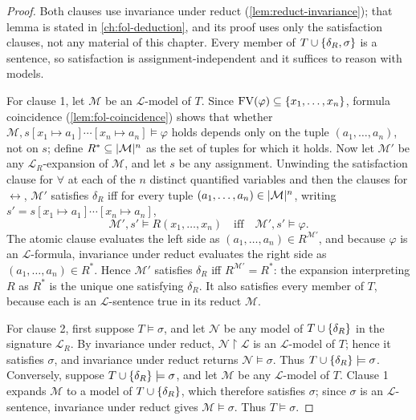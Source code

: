 \documentclass[11pt,oneside,openany]{book}
\theoremstyle{definition}
\theoremstyle{plain}
\theoremstyle{remark}
\DeclarePairedDelimiter{\set}{\lbrace}{\rbrace}
\DeclarePairedDelimiter{\abs}{\lvert}{\rvert}
\newcommand{\Lang}{\mathcal{L}}
\newcommand{\Meta}{\mathcal{M}}
\newcommand{\FV}{\operatorname{FV}}
\newcommand{\restr}{\mathbin{\upharpoonright}}
\newcommand{\entails}{\models}
\begin{document}
\begin{proof}
Both clauses use invariance under reduct
(\cref{lem:reduct-invariance}); that lemma is stated in
\cref{ch:fol-deduction}, and its proof uses only the satisfaction clauses,
not any material of this chapter.  Every member of
\(T\cup\set{\delta_R,\sigma}\) is a sentence, so satisfaction is
assignment-independent and it suffices to reason with models.

For clause 1, let \(\Meta\) be an \(\Lang\)-model of \(T\).  Since
\(\FV(\varphi)\subseteq\set{x_1,\ldots,x_n}\), formula coincidence
(\cref{lem:fol-coincidence}) shows that whether
\(\Meta,s[x_1\mapsto a_1]\cdots[x_n\mapsto a_n]\entails\varphi\) holds
depends only on the tuple \((a_1,\ldots,a_n)\), not on \(s\); define
\(R^*\subseteq\abs{\Meta}^n\) as the set of tuples for which it holds.
Now let \(\Meta'\) be any \(\Lang_R\)-expansion of \(\Meta\), and let
\(s\) be any assignment.  Unwinding the satisfaction clause for
\(\forall\) at each of the \(n\) distinct quantified variables and then
the clauses for \(\leftrightarrow\), \(\Meta'\) satisfies \(\delta_R\)
iff for every tuple \((a_1,\ldots,a_n)\in\abs{\Meta}^n\), writing
\(s'=s[x_1\mapsto a_1]\cdots[x_n\mapsto a_n]\),
\[
 \Meta',s'\entails R(x_1,\ldots,x_n)
 \quad\text{iff}\quad
 \Meta',s'\entails\varphi.
\]
The atomic clause evaluates the left side as
\((a_1,\ldots,a_n)\in R^{\Meta'}\), and because \(\varphi\) is an
\(\Lang\)-formula, invariance under reduct evaluates the right side as
\((a_1,\ldots,a_n)\in R^*\).  Hence \(\Meta'\) satisfies \(\delta_R\)
iff \(R^{\Meta'}=R^*\): the expansion interpreting \(R\) as \(R^*\) is
the unique one satisfying \(\delta_R\).  It also satisfies every member
of \(T\), because each is an \(\Lang\)-sentence true in its reduct
\(\Meta\).

For clause 2, first suppose \(T\entails\sigma\), and let \(\mathcal N\)
be any model of \(T\cup\set{\delta_R}\) in the signature \(\Lang_R\).
By invariance under reduct, \(\mathcal N\restr\Lang\) is an
\(\Lang\)-model of \(T\); hence it satisfies \(\sigma\), and invariance
under reduct returns \(\mathcal N\entails\sigma\).  Thus
\(T\cup\set{\delta_R}\entails\sigma\).  Conversely, suppose
\(T\cup\set{\delta_R}\entails\sigma\), and let \(\Meta\) be any
\(\Lang\)-model of \(T\).  Clause 1 expands \(\Meta\) to a model of
\(T\cup\set{\delta_R}\), which therefore satisfies \(\sigma\); since
\(\sigma\) is an \(\Lang\)-sentence, invariance under reduct gives
\(\Meta\entails\sigma\).  Thus \(T\entails\sigma\).
\end{proof}
\end{document}
